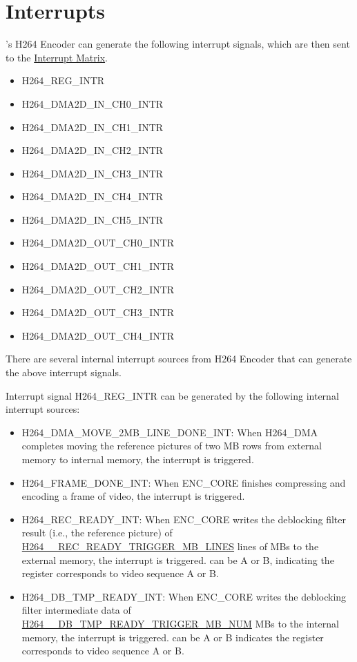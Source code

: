 \documentclass[main\_\_EN.tex]{subfiles}
\begin{document}
\section{Interrupts}
\label{sec:h264enc-interrupt}
\chipname{}'s H264 Encoder can generate the following interrupt signals, which are then sent to the \hyperref[mod:intmtrx]{Interrupt Matrix}.
    \begin{itemize}
        \item H264\_REG\_INTR
        \item H264\_DMA2D\_IN\_CH0\_INTR
        \item H264\_DMA2D\_IN\_CH1\_INTR
        \item H264\_DMA2D\_IN\_CH2\_INTR
        \item H264\_DMA2D\_IN\_CH3\_INTR
        \item H264\_DMA2D\_IN\_CH4\_INTR
        \item H264\_DMA2D\_IN\_CH5\_INTR
        \item H264\_DMA2D\_OUT\_CH0\_INTR
        \item H264\_DMA2D\_OUT\_CH1\_INTR
        \item H264\_DMA2D\_OUT\_CH2\_INTR
        \item H264\_DMA2D\_OUT\_CH3\_INTR
        \item H264\_DMA2D\_OUT\_CH4\_INTR
    \end{itemize}

There are several internal interrupt sources from H264 Encoder that can generate the above interrupt signals.

Interrupt signal H264\_REG\_INTR can be generated by the following internal interrupt sources:
\begin{itemize}
\item H264\_DMA\_MOVE\_2MB\_LINE\_DONE\_INT: When H264\_DMA completes moving the reference pictures of two MB rows from external memory to internal memory, the interrupt is triggered.
\item H264\_FRAME\_DONE\_INT: When ENC\_CORE finishes compressing and encoding a frame of video, the interrupt is triggered.
\item H264\_REC\_READY\_INT: When ENC\_CORE writes the deblocking filter result (i.e., the reference picture) of \hyperref[fielddesc:H264ARECREADYTRIGGERMBLINES]{H264\_\_REC\_READY\_TRIGGER\_MB\_LINES} lines of MBs to the external memory, the interrupt is triggered.  can be A or B, indicating the register corresponds to video sequence A or B.
\item H264\_DB\_TMP\_READY\_INT: When ENC\_CORE writes the deblocking filter intermediate data of \hyperref[fielddesc:H264ADBTMPREADYTRIGGERMBNUM]{H264\_\_DB\_TMP\_READY\_TRIGGER\_MB\_NUM} MBs to the internal memory, the interrupt is triggered.  can be A or B indicates the register corresponds to video sequence A or B.
\end{itemize}
\end{document}
